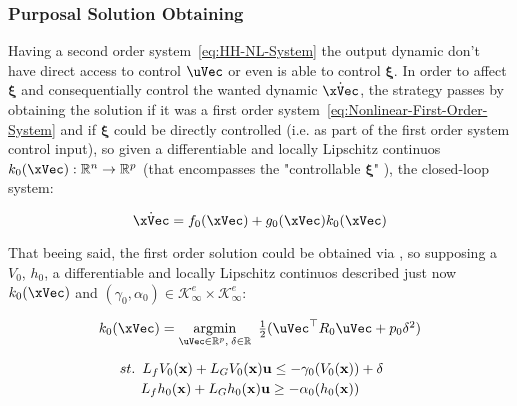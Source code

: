 \subsubsection{Purposal Solution Obtaining}
\label{subsub:quadratic_program_formulation}

Having a second order system~\ref{eq:HH-NL-System} the output dynamic don't have direct access to control \(\uVec\) or even is able to control \(\mathbf{\xi}\). In order to affect \(\mathbf{\xi}\) and consequentially control the wanted dynamic \(\dot{\xVec}\), the strategy passes by obtaining the solution if it was a first order system~\ref{eq:Nonlinear-First-Order-System} and if \(\mathbf{\xi}\) could be directly controlled (i.e. as part of the first order system control input), so given a differentiable and locally Lipschitz continuos \(k_0(\xVec):\mathbb{R}^n \to \mathbb{R}^p\) (that encompasses the "controllable \(\mathbf{\xi}\)" ), the closed-loop system:

\begin{equation}
    \dot{\xVec} = f_0(\xVec) + g_0(\xVec) k_0(\xVec)\\ 
 \label{eq:NL-CL-System-0Backstep}
\end{equation}

That beeing said, the first order solution could be obtained via , so supposing a  \(V_0\),   \(h_0\),  a differentiable and locally Lipschitz continuos described just now \(k_0(\xVec)\) and \((\gamma_0, \alpha_0) \in \mathcal{K}^e_\infty \times \mathcal{K}^e_\infty\):

\begin{equation}
    \begin{array}{l}
        k_0(\xVec) = \underset{\uVec \in \mathbb{R}^p, \hspace{0.2em} \delta \in \mathbb{R}}{\mathrm{argmin}} \quad \hspace{-0.5em} \frac{1}{2} (\uVec^\top R_0 \uVec + p_0\delta^2 ) \vspace{1em} \\ 
        \quad \hspace{0.5em}  st. \hspace{0.5em} L_fV_0(\mathbf{x}) + L_GV_0(\mathbf{x})\mathbf{u} \leq -\gamma_0(V_0(\mathbf{x})) + \delta \vspace{0.25em}\\
        \quad \quad \hspace{1em} L_fh_0(\mathbf{x}) + L_Gh_0(\mathbf{x})\mathbf{u} \geq -\alpha_0(h_0(\mathbf{x}))
    \end{array}
 \label{eq:CLF-CBF-QP-relaxed-0Backstep}
\end{equation}


